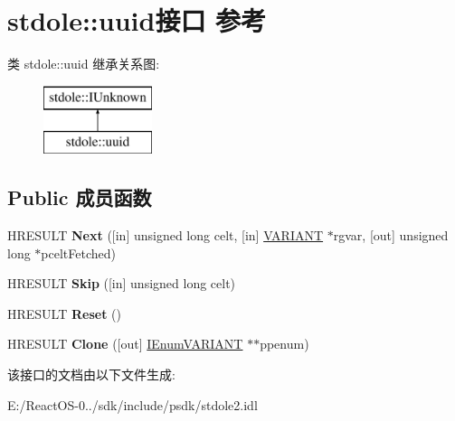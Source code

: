 \hypertarget{interfacestdole_1_1uuid}{}\section{stdole\+:\+:uuid接口 参考}
\label{interfacestdole_1_1uuid}
类 stdole\+:\+:uuid 继承关系图\+:\begin{figure}[H]
\begin{center}
\leavevmode
\includegraphics[height=2.000000cm]{interfacestdole_1_1uuid}
\end{center}
\end{figure}
\subsection*{Public 成员函数}
\begin{DoxyCompactItemize}
\item 
\mbox{\label{interfacestdole_1_1uuid_a683869d1038df6841f017d72af36e593}} 
H\+R\+E\+S\+U\+LT {\bfseries Next} (\mbox{[}in\mbox{]} unsigned long celt, \mbox{[}in\mbox{]} \hyperlink{interfacevoid}{V\+A\+R\+I\+A\+NT} $\ast$rgvar, \mbox{[}out\mbox{]} unsigned long $\ast$pcelt\+Fetched)
\item 
\mbox{\label{interfacestdole_1_1uuid_a10fd583dea69ae910e7d7db14ec7245b}} 
H\+R\+E\+S\+U\+LT {\bfseries Skip} (\mbox{[}in\mbox{]} unsigned long celt)
\item 
\mbox{\label{interfacestdole_1_1uuid_a8e76212169c3946aa5622bdd6f98fca4}} 
H\+R\+E\+S\+U\+LT {\bfseries Reset} ()
\item 
\mbox{\label{interfacestdole_1_1uuid_a608596035a023b24e04155f172e974bc}} 
H\+R\+E\+S\+U\+LT {\bfseries Clone} (\mbox{[}out\mbox{]} \hyperlink{interfacestdole_1_1_i_enum_v_a_r_i_a_n_t}{I\+Enum\+V\+A\+R\+I\+A\+NT} $\ast$$\ast$ppenum)
\end{DoxyCompactItemize}


该接口的文档由以下文件生成\+:\begin{DoxyCompactItemize}
\item 
E\+:/\+React\+O\+S-\/0../sdk/include/psdk/stdole2.\+idl\end{DoxyCompactItemize}
